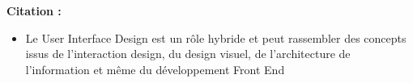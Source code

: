 \textbf{Citation :}

\begin{itemize}
\item Le User Interface Design est un rôle hybride et peut rassembler des concepts issus de l'interaction design, du design visuel, de l'architecture de l'information et même du développement Front End
\end{itemize}

